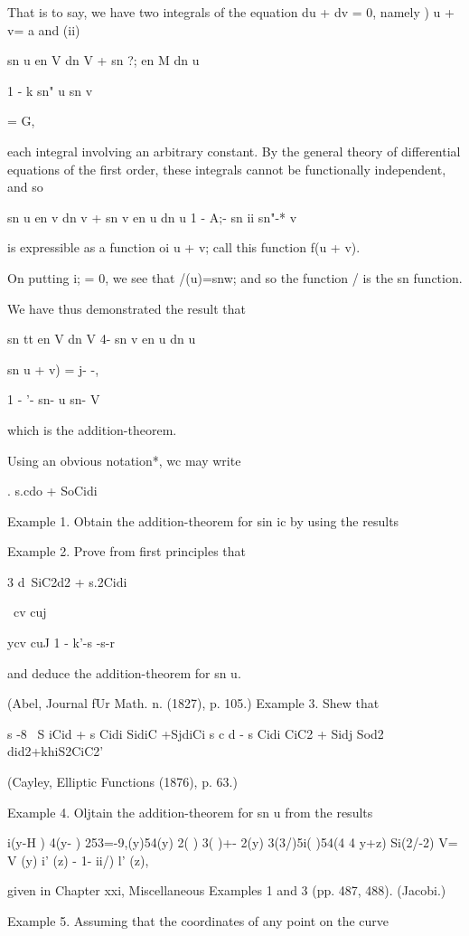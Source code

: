 That is to say, we have two integrals of the equation du + dv = 0,
namely ) u + v= a and (ii)

sn u en V dn V + sn ?; en M dn u

1 - k sn" u sn v

= G,

each integral involving an arbitrary constant. By the general theory
of differential equations of the first order, these integrals cannot
be functionally independent, and so

sn u en v dn v + sn v en u dn u 1 - A;- sn ii sn"-* v

is expressible as a function oi u + v; call this function f(u + v).

On putting i; = 0, we see that /(u)=snw; and so the function / is the
sn function.

We have thus demonstrated the result that

sn tt en V dn V 4- sn v en u dn u

sn u + v) = j- -,

1 - '- sn- u sn- V

which is the addition-theorem.

Using an obvious notation*, wc may write

. s.cdo + SoCidi

Example 1. Obtain the addition-theorem for sin ic by using the results

Example 2. Prove from first principles that

3 d\ SiC2d2 + s.2Cidi\

\ cv cuj

ycv cuJ 1 - k'-s -s-r

and deduce the addition-theorem for sn u.

(Abel, Journal fUr Math. n. (1827), p. 105.) Example 3. Shew that

s -8 \ S iCid + s Cidi SidiC +SjdiCi s c d - s Cidi CiC2 + Sidj Sod2
did2+khiS2CiC2'

(Cayley, Elliptic Functions (1876), p. 63.)

Example 4. Oljtain the addition-theorem for sn u from the results

 i(y-H ) 4(y- ) 253=-9,(y)54(y) 2( ) 3( )+- 2(y) 3(3/)5i( )54(4 4 y+z)
Si(2/-2) V= V (y) i' (z) - 1- ii/) l' (z),

given in Chapter xxi, Miscellaneous Examples 1 and 3 (pp. 487, 488).
(Jacobi.)

Example 5. Assuming that the coordinates of any point on the curve

